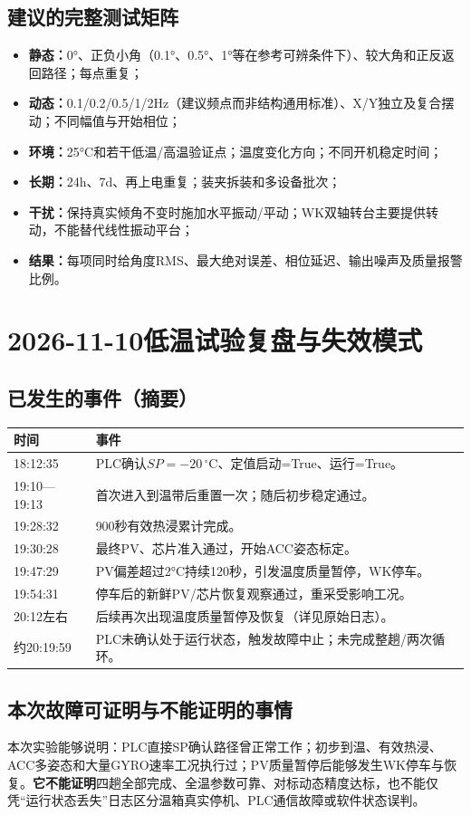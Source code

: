 \documentclass[UTF8,a4paper,11pt,oneside,openany,fontset=none]{ctexbook}
\newcommand{\degc}{\,^{\circ}\mathrm C}
\begin{document}
\section{建议的完整测试矩阵}
\begin{itemize}
\item \textbf{静态：}0°、正负小角（0.1°、0.5°、1°等在参考可辨条件下）、较大角和正反返回路径；每点重复；
\item \textbf{动态：}0.1/0.2/0.5/1/2Hz（建议频点而非结构通用标准）、X/Y独立及复合摆动；不同幅值与开始相位；
\item \textbf{环境：}25°C和若干低温/高温验证点；温度变化方向；不同开机稳定时间；
\item \textbf{长期：}24h、7d、再上电重复；装夹拆装和多设备批次；
\item \textbf{干扰：}保持真实倾角不变时施加水平振动/平动；WK双轴转台主要提供转动，不能替代线性振动平台；
\item \textbf{结果：}每项同时给角度RMS、最大绝对误差、相位延迟、输出噪声及质量报警比例。
\end{itemize}

\chapter{2026-11-10低温试验复盘与失效模式}
\section{已发生的事件（摘要）}
\begin{longtable}{p{2.0cm}p{9.8cm}}
\toprule 时间 & 事件\\\midrule\endhead
18:12:35 & PLC确认$SP=-20\degc$、定值启动=True、运行=True。\\
19:10—19:13 & 首次进入到温带后重置一次；随后初步稳定通过。\\
19:28:32 & 900秒有效热浸累计完成。\\
19:30:28 & 最终PV、芯片准入通过，开始ACC姿态标定。\\
19:47:29 & PV偏差超过2°C持续120秒，引发温度质量暂停，WK停车。\\
19:54:31 & 停车后的新鲜PV/芯片恢复观察通过，重采受影响工况。\\
20:12左右 & 后续再次出现温度质量暂停及恢复（详见原始日志）。\\
约20:19:59 & PLC未确认处于运行状态，触发故障中止；未完成整趟/两次循环。\\\bottomrule
\end{longtable}

\section{本次故障可证明与不能证明的事情}
\begin{keypoint}
本次实验能够说明：PLC直接SP确认路径曾正常工作；初步到温、有效热浸、ACC多姿态和大量GYRO速率工况执行过；PV质量暂停后能够发生WK停车与恢复。\textbf{它不能证明}四趟全部完成、全温参数可靠、对标动态精度达标，也不能仅凭“运行状态丢失”日志区分温箱真实停机、PLC通信故障或软件状态误判。
\end{keypoint}
\end{document}
